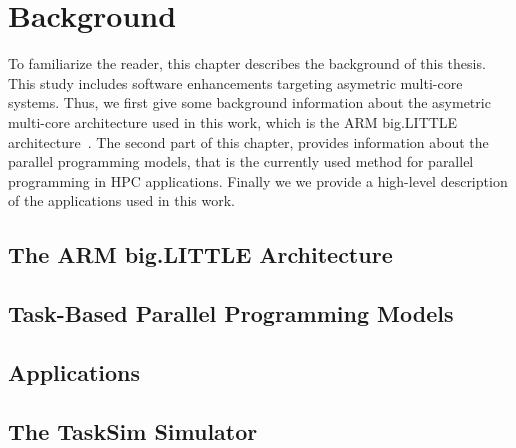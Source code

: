 \chapter{Background}
To familiarize the reader, this chapter describes the background of this thesis. 
This study includes software enhancements targeting asymetric multi-core systems.
Thus, we first give some background information about the asymetric multi-core architecture used in this work, which is the ARM big.LITTLE architecture~\cite{Greenhalgh2011}.
The second part of this chapter, provides information about the parallel programming models, that is the currently used method for parallel programming in HPC applications.
Finally we we provide a high-level description of the applications used in this work.

\section{The ARM big.LITTLE Architecture}


\section{Task-Based Parallel Programming Models}


\section{Applications}


\section{The TaskSim Simulator}

